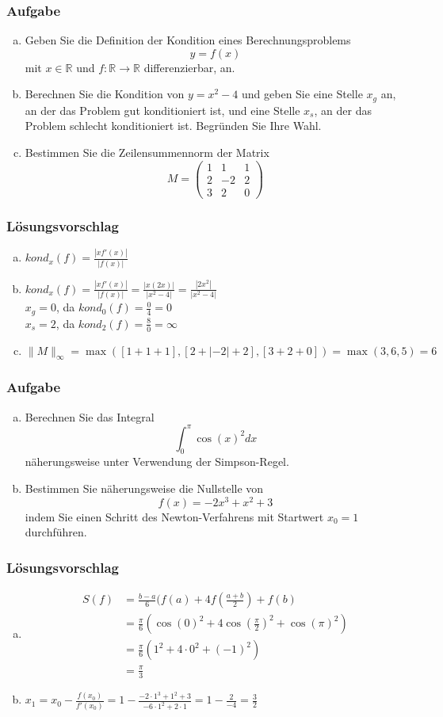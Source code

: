 \documentclass[a4paper,11pt]{scrartcl}
\newcounter{auf}
\newcommand{\Aufgabe}%
        {\addtocounter{auf}{1} \subsubsection*{\rmfamily  Aufgabe \theauf \hspace{1em}} }
\newcommand{\RR}{\mathbb{R}}
\begin{document}
\Aufgabe

\begin{enumerate}[a)]

\item Geben Sie die Definition der Kondition eines Berechnungsproblems 
$$
	y=f(x)
$$
mit $x \in \RR$ und $f:\RR \to \RR$ differenzierbar, an.
\item  Berechnen Sie die Kondition von $y=x^2-4$ und geben Sie eine Stelle $x_g$ an, an der das Problem gut konditioniert ist, und eine Stelle $x_s$, an der das Problem schlecht konditioniert ist. Begründen Sie Ihre Wahl.
\item Bestimmen Sie die Zeilensummennorm der Matrix
$$
M=\begin{pmatrix} 1&1&1 \\ 2&-2&2\\ 3 & 2&0 \end{pmatrix}
$$
\end{enumerate}
%
%
\subsubsection*{Lösungsvorschlag}
\begin{enumerate}[a)]
\item $kond_x(f)=\frac{|xf'(x)|}{|f(x)|}$
\item $kond_x(f)=\frac{|xf'(x)|}{|f(x)|}=\frac{|x(2x)|}{|x^2-4|}=\frac{|2x^2|}{|x^2-4|}$\\
$x_g=0$, da $kond_0(f)=\frac{0}{4}=0$\\
$x_s=2$, da $kond_{2}(f)=\frac{8}{0}=\infty$
\item $\|M\|_\infty = \max([1+1+1],[2+|-2|+2],[3+2+0])=\max(3,6,5)=6$
\end{enumerate}
\newpage
\Aufgabe
\begin{enumerate}[a)]
\item Berechnen Sie das Integral
$$
\int_0^\pi \cos(x)^2 dx
$$
näherungsweise unter Verwendung
der Simpson-Regel.
\item Bestimmen Sie näherungsweise die Nullstelle von 
$$
f(x)=-2x^3+x^2+3
$$
indem Sie einen Schritt des Newton-Verfahrens mit Startwert $x_0=1$ durchführen.
\end{enumerate}
%
%
\subsubsection*{Lösungsvorschlag}
\begin{enumerate}[a)]
\item 
\begin{align*}
S(f)&=\frac{b-a}{6}(f(a)+4f(\frac{a+b}{2})+f(b)\\
&=\frac{\pi}{6}(\cos(0)^2+4\cos(\frac{\pi}{2})^2+\cos(\pi)^2)\\
&=\frac{\pi}{6}(1^2+4\cdot 0^2+(-1)^2)\\
&=\frac{\pi}{3}
\end{align*}
\item $x_1=x_0-\frac{f(x_0)}{f'(x_0)}=1-\frac{-2\cdot 1^3+1^2+3}{-6\cdot 1^2+2\cdot 1}=1-\frac{2}{-4}=\frac{3}{2}$
\end{enumerate}
\end{document}

